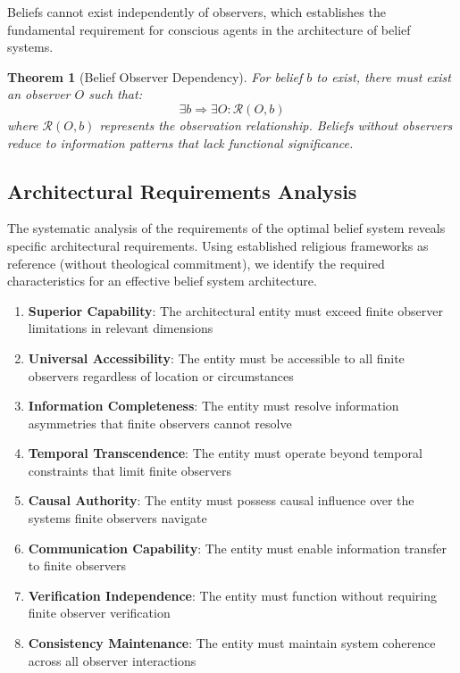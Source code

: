 \documentclass[12pt,a4paper]{article}
\newtheorem{theorem}{Theorem}
\begin{document}
Beliefs cannot exist independently of observers, which establishes the fundamental requirement for conscious agents in the architecture of belief systems.

\begin{theorem}[Belief Observer Dependency]
For belief $b$ to exist, there must exist an observer $O$ such that:
$$\exists b \Rightarrow \exists O : \mathcal{R}(O, b)$$
where $\mathcal{R}(O, b)$ represents the observation relationship. Beliefs without observers reduce to information patterns that lack functional significance.
\end{theorem}

\subsection{Architectural Requirements Analysis}

The systematic analysis of the requirements of the optimal belief system reveals specific architectural requirements. Using established religious frameworks as reference (without theological commitment), we identify the required characteristics for an effective belief system architecture.

\begin{enumerate}
\item \textbf{Superior Capability}: The architectural entity must exceed finite observer limitations in relevant dimensions
\item \textbf{Universal Accessibility}: The entity must be accessible to all finite observers regardless of location or circumstances  
\item \textbf{Information Completeness}: The entity must resolve information asymmetries that finite observers cannot resolve
\item \textbf{Temporal Transcendence}: The entity must operate beyond temporal constraints that limit finite observers
\item \textbf{Causal Authority}: The entity must possess causal influence over the systems finite observers navigate
\item \textbf{Communication Capability}: The entity must enable information transfer to finite observers
\item \textbf{Verification Independence}: The entity must function without requiring finite observer verification
\item \textbf{Consistency Maintenance}: The entity must maintain system coherence across all observer interactions
\end{enumerate}
\end{document}
